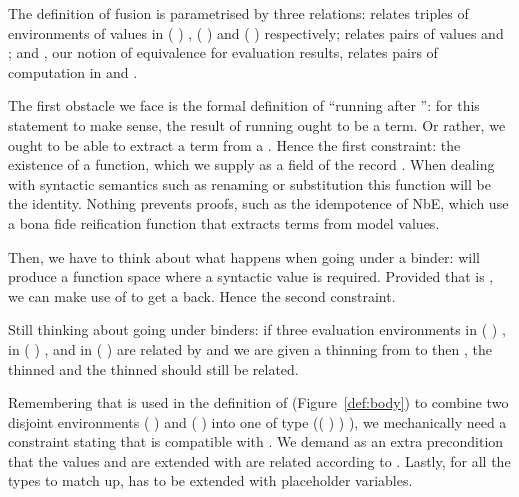 The definition of fusion is parametrised by three relations:  relates
triples of environments of values in {( )  },
{( )  } and {( )  }
respectively;  relates pairs of values  and ;
and , our notion of equivalence for evaluation results, relates pairs
of computation in  and .


The first obstacle we face is the formal definition of ``running 
after '': for this statement to make sense, the result of running
 ought to be a term. Or rather, we ought to be able to extract a
term from a . Hence the first constraint: the existence of a 
function, which we supply as a field of the record . When dealing with
syntactic semantics such as renaming or substitution
this function will be the identity. Nothing prevents proofs, such as the
idempotence of NbE, which use a bona fide reification function that extracts
terms from model values.


Then, we have to think about what happens when going under a binder: 
will produce a  function space where a syntactic
value is required. Provided that  is , we can make use of 
to get a  back. Hence the second constraint.


Still thinking about going under binders: if three evaluation environments
 in {( )  },  in
{( )  }, and  in {( )  }
are related by  and we are given a thinning  from  to 
then , the thinned  and the thinned  should still be related.


Remembering that \AF{\_>>\_} is used in the definition of  (Figure~\ref{def:body}) to
combine two disjoint environments {( )  } and
{( )  } into one of type
{(( \AF{++} ) )  )}, we mechanically need a
constraint stating that \AF{\_>>\_} is compatible with . We demand
as an extra precondition that the values  and  are extended
with are related according to . Lastly, for all the types to match up,
 has to be extended with placeholder variables.

